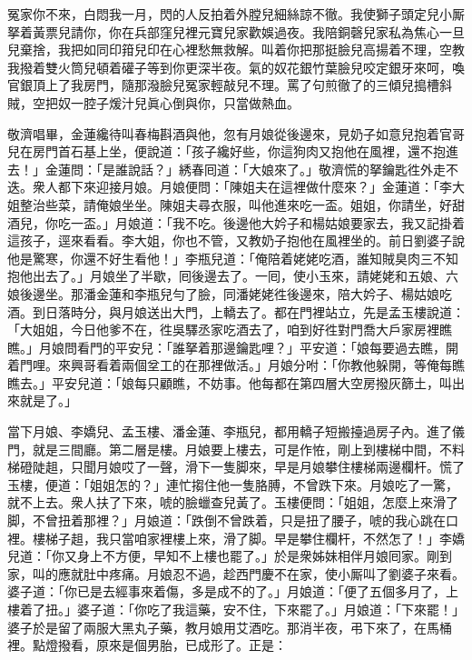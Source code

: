 \begin{myquote} 
冤家你不來，白悶我一月，閃的人反拍着外膛兒細絲諒不徹。我使獅子頭定兒小厮拏着黃票兒請你，你在兵部窪兒裡元寶兒家歡娛過夜。我陪銅磬兒家私為焦心一旦兒棄捨，我把如同印箝兒印在心裡愁無救解。叫着你把那挺臉兒高揚着不理，空教我撥着雙火筒兒頓着礶子等到你更深半夜。氣的奴花銀竹葉臉兒咬定銀牙來呵，喚官銀頂上了我房門，隨那潑臉兒冤家輕敲兒不理。罵了句煎徹了的三傾兒搗槽斜賊，空把奴一腔子煖汁兒眞心倒與你，只當做熱血。
\end{myquote} 

敬濟唱畢，金蓮纔待叫春梅斟酒與他，忽有月娘從後邊來，見奶子如意兒抱着官哥兒在房門首石基上坐，便說道：「孩子纔好些，你這狗肉又抱他在風裡，還不抱進去！」金蓮問：「是誰說話？」綉春囘道：「大娘來了。」敬濟慌的拏鑰匙徃外走不迭。衆人都下來迎接月娘。月娘便問：「陳姐夫在這裡做什麼來？」金蓮道：「李大姐整治些菜，請俺娘坐坐。{}陳姐夫尋衣服，叫他進來吃一盃。姐姐，你請坐，好甜酒兒，你吃一盃。」月娘道：「我不吃。後邊他大妗子和楊姑娘要家去，我又記掛着這孩子，逕來看看。李大姐，你也不管，又教奶子抱他在風裡坐的。前日劉婆子說他是驚寒，你還不好生看他！」李瓶兒道：「俺陪着姥姥吃酒，誰知賊臭肉三不知抱他出去了。」月娘坐了半歇，囘後邊去了。一囘，使小玉來，請姥姥和五娘、六娘後邊坐。那潘金蓮和李瓶兒勻了臉，同潘姥姥徃後邊來，陪大妗子、楊姑娘吃酒。到日落時分，與月娘送出大門，上轎去了。都在門裡站立，先是孟玉樓說道：「大姐姐，今日他爹不在，徃吳驛丞家吃酒去了，咱到好徃對門喬大戶家房裡瞧瞧。」月娘問看門的平安兒：「誰拏着那邊鑰匙哩？」平安道：「娘每要過去瞧，開着門哩。來興哥看着兩個坌工的在那裡做活。」月娘分咐：「你教他躲開，等俺每瞧瞧去。」平安兒道：「娘每只顧瞧，不妨事。他每都在第四層大空房撥灰篩土，叫出來就是了。」

當下月娘、李嬌兒、孟玉樓、潘金蓮、李瓶兒，都用轎子短搬擡過房子內。進了儀門，就是三間廳。第二層是樓。月娘要上樓去，可是作恠，剛上到樓梯中間，不料梯磴陡趄，只聞月娘哎了一聲，滑下一隻脚來，早是月娘攀住樓梯兩邊欄杆。慌了玉樓，便道：「姐姐怎的？」連忙搊住他一隻胳膊，不曾跌下來。月娘吃了一驚，就不上去。衆人扶了下來，唬的臉蠟查兒黃了。玉樓便問：「姐姐，怎麼上來滑了脚，不曾扭着那裡？」月娘道：「跌倒不曾跌着，只是扭了腰子，唬的我心跳在口裡。樓梯子趄，我只當咱家裡樓上來，滑了脚。早是攀住欄杆，不然怎了！」李嬌兒道：「你又身上不方便，早知不上樓也罷了。」於是衆姊妹相伴月娘囘家。剛到家，叫的應就肚中疼痛。月娘忍不過，趁西門慶不在家，使小厮叫了劉婆子來看。婆子道：「你已是去經事來着傷，多是成不的了。」月娘道：「便了五個多月了，上樓着了扭。」婆子道：「你吃了我這藥，安不住，下來罷了。」{}月娘道：「下來罷！」婆子於是留了兩服大黑丸子藥，教月娘用艾酒吃。那消半夜，弔下來了，在馬桶裡。點燈撥看，原來是個男胎，已成形了。正是：


